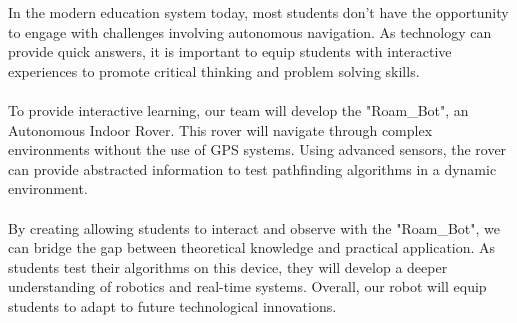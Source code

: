 In the modern education system today, most students don't have the opportunity to engage with challenges involving autonomous navigation. As technology can provide quick answers, it is important to equip students with interactive experiences to promote critical thinking and problem solving skills.
\\\\
To provide interactive learning, our team will develop the "Roam\_Bot", an Autonomous Indoor Rover. This rover will navigate through complex environments without the use of GPS systems. Using advanced sensors, the rover can provide abstracted information to test pathfinding algorithms in a dynamic environment.
\\\\
By creating allowing students to interact and observe with the "Roam\_Bot", we can bridge the gap between theoretical knowledge and practical application. As students test their algorithms on this device, they will develop a deeper understanding of robotics and real-time systems. Overall, our robot will equip students to adapt to future technological innovations.




